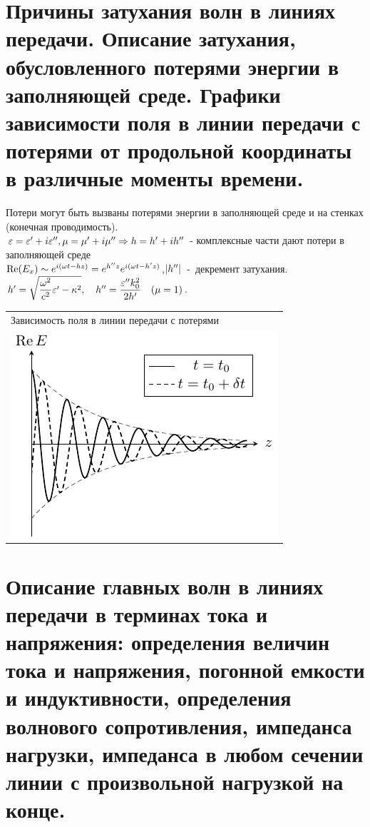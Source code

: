 \begin{multicols*}{2}
		\section{Причины затухания волн в линиях передачи. Описание затухания, обусловленного потерями энергии в заполняющей среде. Графики зависимости поля в линии передачи с потерями от продольной координаты в различные моменты времени.}
		
		Потери могут быть вызваны потерями энергии в заполняющей среде и на стенках (конечная проводимость). \\
		$\varepsilon=\varepsilon'+i\varepsilon'', \mu=\mu'+i\mu'' \Rightarrow h=h'+ih''$  - комплексные части дают потери в заполняющей среде \\
		$\Re(E_x)\sim e^{i(\omega t-hz)}=e^{h''z}e^{i(\omega t-h'z)}$,\quad $\abs{h''}$~-~декремент затухания. \\
		$h' = \sqrt{\dfrac{\omega^2}{c^2} \varepsilon' - \kappa^2}, \quad h'' = \dfrac{\varepsilon'' k_{0}^2}{2 h'}\quad (\mu=1)$. \\
		\begin{tabular}{l}
			{Зависимость поля в линии передачи с потерями} \\
			\includegraphics[width=0.25\linewidth]{aed_imgs/ask8_1} \\
		\end{tabular}
		
		\section{Описание главных волн в линиях передачи в терминах тока и напряжения: определения величин тока и напряжения, погонной емкости и индуктивности, определения волнового сопротивления, импеданса нагрузки, импеданса в любом сечении линии с произвольной нагрузкой на конце.}
		

\end{multicols*}
